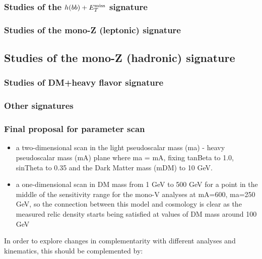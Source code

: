 \subsubsection{Studies of the $h(bb)+E_T^\mathrm{miss}$ signature}


\FloatBarrier
\subsubsection{Studies of the mono-Z (leptonic) signature}

\FloatBarrier
\subsection{Studies of the mono-Z (hadronic) signature}


\subsubsection{Studies of DM+heavy flavor signature}


\subsubsection{Other signatures}


\subsubsection{Final proposal for parameter scan}

\begin{itemize}

\item a two-dimensional scan in the light pseudoscalar mass (ma) -
heavy pseudoscalar mass (mA) plane where ma = mA, fixing tanBeta to 1.0,
sinTheta to 0.35 and the Dark Matter mass (mDM) to 10 GeV.


\item a one-dimensional scan in DM mass from 1 GeV to 500 GeV for a
point in the middle of the sensitivity range for the mono-V analyses at
mA=600, ma=250 GeV, so the connection between this model and cosmology
is clear as the measured relic density starts being satisfied at values
of DM mass around 100 GeV

\end{itemize}


In order to explore changes in complementarity with different
analyses and kinematics, this should be complemented by:

